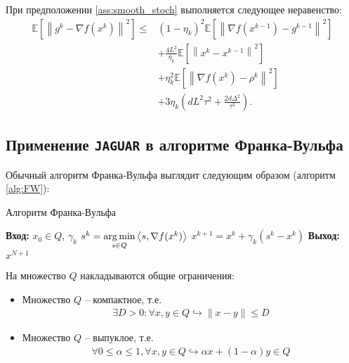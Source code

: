     \begin{lemma} \label{lemma:g_vs_nabla_f}
    
        При предположении \ref{ass:smooth_stoch} выполняется следующее неравенство:
        \begin{align*}
            \mathbb{E} \left[ \left\| g^k - \nabla f(x^k) \right\|^2 \right]
            \leq &
            \left(1 - \eta_k \right)^2 \mathbb{E} \left[ \left\| \nabla f(x^{k - 1}) - g^{k - 1} \right\|^2 \right] \\
            &+
            \frac{4 L^2}{\eta_k} \mathbb{E} \left[ \left\| x^k - x^{k - 1} \right\|^2 \right] \\
            &+
            \eta_k^2 \mathbb{E} \left[ \left\| \nabla f(x^k) - \rho^k \right\|^2 \right] \\
            &+
            3 \eta_k \left( d L^2 \tau^2 + \frac{2 d \Delta^2}{\tau^2} \right).
        \end{align*}
        
    \end{lemma}

\subsection{Применение \texttt{JAGUAR} в алгоритме Франка-Вульфа}

    Обычный алгоритм Франка-Вульфа выглядит следующим образом (алгоритм \ref{alg:FW}):
    
    \begin{algorithm}[H]
        \caption{Алгоритм Франка-Вульфа} \label{alg:FW}
        \begin{algorithmic}[1]
            \State \textbf{Вход:} $x_0 \in Q$, $\gamma_k$
                \State $s^k = \operatorname*{arg\,min}\limits_{s \in Q} \left< s, \nabla f(x^k) \right>$
                \State $x^{k+1} = x^k + \gamma_k (s^k - x^k)$
            \EndFor
            \State \textbf{Выход:} $x^{N + 1}$ 
        \end{algorithmic}
    \end{algorithm}

    На множество $Q$ накладываются общие ограничения:
    \begin{itemize}
        \item Множество $Q$ -- компактное, т.е.
        \begin{align} \label{ass:compact}
            \exists D > 0 : \forall x, y \in Q \hookrightarrow \|x - y\| \leq D
        \end{align}
        \item Множество $Q$ -- выпуклое, т.е.
        \begin{align} \label{ass:convex}
            \forall 0 \leq \alpha \leq 1, \forall x, y \in Q \hookrightarrow \alpha x + (1 - \alpha) y \in Q
        \end{align}
    \end{itemize}


